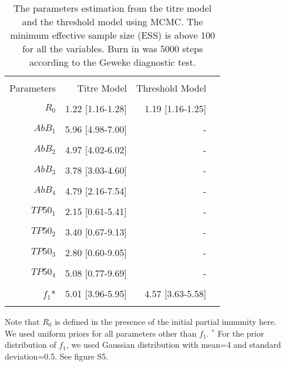 \documentclass[12pt,a4paper]{article}
\begin{document}
\begin{table}[ht]
\begin{minipage}{\textwidth}     
\centering %
\caption{The parameters estimation from the titre model and the threshold model using MCMC. The minimum effective sample size (ESS) is above 100 for all the variables. Burn in was 5000 steps according to the Geweke diagnostic test.}

\centering %
\begin{tabular}{rrrr}

\hline\hline \\%
Parameters &          Titre Model &        Threshold Model\\ \\
\hline %
 
   $R_{0}$ &	    1.22 [1.16-1.28] &	1.19 [1.16-1.25]  \\ \\
   $AbB_{1}$ &     5.96 [4.98-7.00] &  - \\ \\

   $AbB_{2}$ &     4.97 [4.02-6.02] &  - \\ \\

   $AbB_{3}$ &     3.78 [3.03-4.60] &  - \\ \\

   $AbB_{4}$ &     4.79 [2.16-7.54] &  - \\ \\
    $\mathit{TP50_{1}}$ &    2.15 [0.61-5.41] &  		- \\ \\

   $\mathit{TP50_{2}}$ &    3.40 [0.67-9.13] &  		- \\ \\

   $\mathit{TP50_{3}}$ &    2.80 [0.60-9.05] &  		- \\ \\

   $\mathit{TP50_{4}}$ &    5.08 [0.77-9.69] &  		- \\ \\

   $f_{1}$*          &   	5.01 [3.96-5.95]&         4.57 [3.63-5.58] \\ \\
\hline
\end{tabular}
\end{minipage}
\end{table}
Note that $R_{0}$ is defined in the presence of the initial partial immunity here.
\\
We used uniform priors for all parameters other than $f_{1}$. $^*$ For the prior distribution of $f_{1}$, we used Gaussian distribution with mean=4 and standard deviation=0.5. See figure S5.
\end{document}
